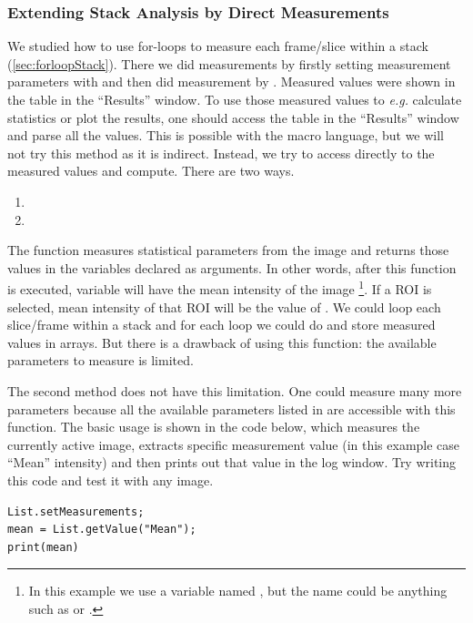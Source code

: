 \subsubsection{Extending Stack Analysis by Direct Measurements}

We studied how to use for-loops to measure each frame/slice within a stack (\ref{sec:forloopStack}). There we did measurements by firstly setting measurement parameters with  and then did measurement by . Measured values were shown in the table in the ``Results'' window. To use those measured values to \textit{e.g.} calculate statistics or plot the results, one should access the table in the ``Results'' window and parse all the values. This is possible with the macro language, but we will not try this method as it is indirect. Instead, we try to access directly to the measured values and compute. There are two ways. 

\begin{enumerate}
\item {}
\item {}
\end{enumerate}
The function  measures statistical parameters from the image and returns those values in the variables declared as arguments. In other words, after this function is executed, variable  will have the mean intensity of the image
\footnote{In this example we use a variable named , but the name could be anything such as  or .}. 
If a ROI is selected, mean intensity of that ROI will be the value of . We could loop each slice/frame within a stack and for each loop we could do  and store measured values in arrays. But there is a drawback of using this function: the available parameters to measure is limited. 

The second method  does not have this limitation. One could measure many more parameters because all the available parameters listed in  are accessible with this function. The basic usage is shown in the code below, which measures the currently active image, extracts specific measurement value (in this example case ``Mean'' intensity) and then prints out that value in the log window. Try writing this code and test it with any image. 

\begin{lstlisting}
List.setMeasurements;
mean = List.getValue("Mean");
print(mean)
\end{lstlisting}

